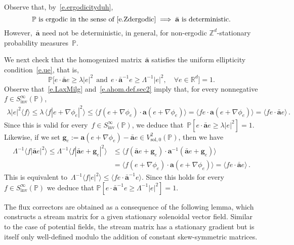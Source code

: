 \documentclass[11pt]{article} %
\numberwithin{equation}{section}
\theoremstyle{definition}
\newcommand*{\Zd}{\ensuremath{\mathbb{Z}^d}}
\newcommand*{\Rd}{\ensuremath{\mathbb{R}^d}}
\newcommand{\g}{\mathbf{g}}
\newcommand{\sol}{\mathrm{sol}}
\renewcommand{\a}{\mathbf{a}}
\newcommand{\ahom}{\bar{\a}}
\renewcommand{\P}{\mathbb{P}}
\begin{document}
Observe that, by~\eqref{e.ergodicityduh}, 
\begin{equation}
\mbox{$\P$ is ergodic in the sense of~\eqref{e.Zdergodic}}
\implies
\mbox{$\ahom$ is deterministic.}
\end{equation}
However,~$\ahom$ need not be deterministic, in general, for non-ergodic $\Zd$-stationary probability measures~$\P$. 

\smallskip

We next check that the homogenized matrix~$\ahom$ satisfies the uniform ellipticity condition~\eqref{e.ue}, that is, 
\begin{equation}
\label{e.ahom.boundsme}
\P \Big[ 
e\cdot \ahom e \geq \lambda |e|^2
\ \ \mbox{and} \ \
e\cdot \ahom^{-1} e 
\geq 
\Lambda^{-1} |e|^2,
\quad \forall e\in\Rd
\Big]
= 1.
\end{equation}
Observe that~\eqref{e.LaxMilg} and~\eqref{e.ahom.def.sec2} imply that, for every nonnegative $f \in S^\infty_{\mathrm{inv}}(\P)$, 
\begin{align*}
\lambda |e|^2 \bigl\langle f \bigr\rangle
\leq 
\lambda \,\bigl\langle f |e+\nabla\phi_e|^2\bigr\rangle 
\leq
\bigl\langle f (e+\nabla\phi_e) \cdot \a (e+\nabla \phi_e) \bigr\rangle
=
\bigl\langle f e \cdot \a (e+\nabla \phi_e) \bigr\rangle
=
\bigl\langle f e \cdot \ahom e \bigr\rangle\,.
\end{align*}
Since this is valid for every~$f \in S^\infty_{\mathrm{inv}}(\P)$, we deduce that~$\P [e\cdot \ahom e \geq \lambda |e|^2] = 1$. 
Likewise, if we set $\g_e := \a(e+\nabla\phi_e) - \ahom e \in V^2_{\sol,0}(\P)$, then we have 
\begin{align*}
\Lambda^{-1} \bigl \langle f | \ahom e|^2 \bigr\rangle
\leq 
\Lambda^{-1} 
\bigl \langle f | \ahom e + \g_e |^2 \bigr\rangle
&
\leq 
\bigl \langle f ( \ahom e + \g_e ) \cdot \a^{-1} ( \ahom e + \g_e ) \bigr\rangle
\\ & 
=
\bigl \langle f ( e+\nabla \phi_e ) \cdot \a ( e + \nabla \phi_e ) \bigr\rangle
= \bigl\langle f e \cdot \ahom e \bigr\rangle\,.
\end{align*}
This is equivalent to~$\Lambda^{-1} \bigl \langle f | e|^2 \bigr\rangle \leq \bigl\langle f e \cdot \ahom^{-1} e \bigr\rangle$.
Since this holds for every~$f \in S^\infty_{\mathrm{inv}}(\P)$ we deduce that $\P [ e\cdot \ahom^{-1} e 
\geq 
\Lambda^{-1} |e|^2 ] = 1$. 
 
\smallskip 
 
The flux correctors are obtained as a consequence of the following lemma, which constructs a stream matrix for a given stationary solenoidal vector field. Similar to the case of potential fields, the stream matrix has a stationary gradient but is itself only well-defined modulo the addition of constant skew-symmetric matrices. 
\end{document}

